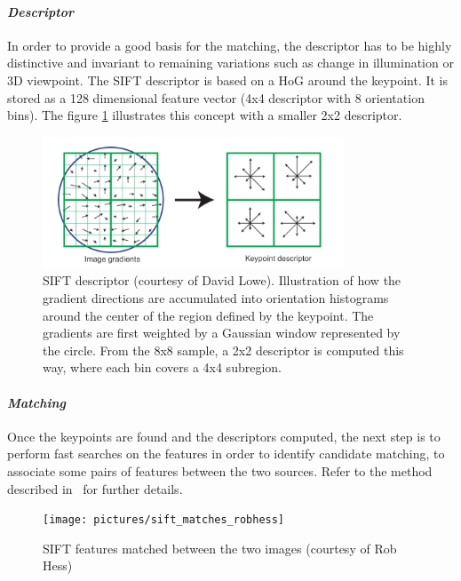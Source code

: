 \paragraph{\emph{Descriptor}}

In order to provide a good basis for the matching, the descriptor has to be highly distinctive and invariant to remaining variations such as change in illumination or 3D viewpoint. The \gls{SIFT} descriptor is based on a \gls{HoG} around the keypoint. It is stored as a 128 dimensional feature vector (4x4 descriptor with 8 orientation bins). The figure \ref{fig:sift_descriptor} illustrates this concept with a smaller 2x2 descriptor.

\begin{figure}[h]
\centering
\includegraphics[width=0.8\textwidth]{figures/sift_descriptor}
\caption{SIFT descriptor (courtesy of David Lowe). Illustration of how the gradient directions are accumulated into orientation histograms around the center of the region defined by the keypoint. The gradients are first weighted by a Gaussian window represented by the circle. From the 8x8 sample, a 2x2 descriptor is computed this way, where each bin covers a 4x4 subregion.}
\label{fig:sift_descriptor}
\end{figure}

\clearpage
\paragraph{\emph{Matching}}

Once the keypoints are found and the descriptors computed, the next step is to perform fast searches on the features in order to identify candidate matching, to associate some pairs of features between the two sources. Refer to the method described in~\cite{lowe_2004_sift} for further details.

\begin{figure}[h]
\centering
\texttt{[image: pictures/sift\_matches\_robhess]}
\caption{SIFT features matched between the two images (courtesy of Rob Hess)}
\end{figure}

